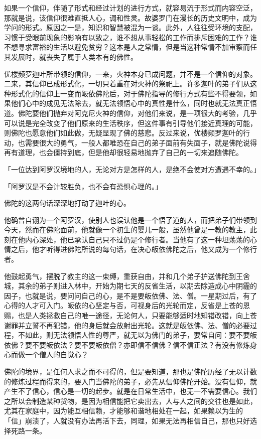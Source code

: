 \documentclass[12pt,twoside,openany]{book}
\begin{document}
如果一个信仰，伴随了形式和经过计划的进行方式，就容易流于形式而内容空泛，那就是说，该信仰很难直抵人心，调和性灵。故婆罗门在漫长的历史文明中，成为学问的形式。原因之一是，知识和智慧被混为一谈。此外，人往往受环境的支配，习惯于受眼前现象的影响有以致之，谁不想从事轻松的工作而排斥困难的工作？谁不想寻求富裕的生活以避免贫穷？这本是人之常情，但是当这种常情不加审察而任其发展时，就丧失了属于人类本有的佛性。

优楼频罗迦叶所带领的信仰，一来，火神本身已成问题，并不是一个信仰的对象。二来，其信仰已成形式化，一切只着重在对火神的祭祀上。许多迦叶的弟子们从这种形式化的信仰上一变而皈依佛陀后，对于佛陀指导的修行方式有些不得要领，如果他们心中的成见无法除去，就无法领悟心中的真性是什么，同时也就无法真正悟道。佛陀要他们抛弃对阿克尼火神的信仰，对他们来说，是一项很大的考验，几乎可以说是完全改变了他们原来的生活秩序，但这件事有引导他们接近真理的可能，则佛陀也愿意他们如此做，无疑显现了佛的慈悲。反过来说，优楼频罗迦叶的行动，也需要很大的勇气，一般人都唯恐在自己的弟子面前有失面子，就是佛陀说得再有道理，也会僵持到底，但是他却很轻易地抛弃了自己的一切来追随佛陀。

「一位达到阿罗汉境地的人，无论对方是怎样的人，是绝不会使对方遭遇不幸的。」

「阿罗汉是不会计较胜负，也不会有恐惧心理的。」

佛陀的这两句话深深地打动了迦叶的心。

他确曾自诩为一个阿罗汉，使别人也误认他是一个悟了道的人，而把弟子们带领到今天，然而在佛陀面前，他就像一个初生的婴儿一般，虽然他曾是一教的教主，此刻在他内心深处，他已承认自己只不过仍是个修行者。当他有了这一种坦荡荡的心情之后，他才听得进佛陀所说的每句话，在决心皈依佛陀之后，他又成为一个修行者。

他鼓起勇气，摆脱了教主的这一束缚，重获自由，并和几个弟子护送佛陀到王舍城，其余的弟子则进入林中，开始为期七天的反省生活，以期去除造成心中阴霾的因子，也就是说，要问问自己的心，是不是要皈依佛、法、僧。一星期过后，有了心得的人才可入门。皈依的心坚定与否，可视身后的光轮而定，反省是上苍的恩赐，也是人类拯救自己的唯一途径，无论何人，只要能够适时地知错改错，向上苍谢罪并立誓不再犯错，他的身后就会放射出光轮。这就是皈依佛、法、僧的必要过程，不如此，则无法领悟人性的尊严，就无以为佛门的弟子，要常自问：要不要皈依佛？要不要皈依法？要不要皈依僧？亦即信不信佛？信不信正法？有没有修炼身心而做一个僧人的自觉心？

佛陀的境界，是任何人求之而不可得的，但是要知道，那也是佛陀历经了无以计数的修炼过程而得来的，要入门当佛陀的弟子，必先从信仰佛陀开始。没有信仰，就产生不了信心，信心是一切的起步。就是在日常生活中，也无一不需要信心。我们之所以会制造某种货物，是因为相信能把它卖出去，人与人之间的交往也是如此，尤其在家庭中，因为能互相信赖，才能够和谐地相处在一起，如果赖以为生的「信」崩溃了，人就没有办法再活下去，同理，如果无法再相信自己，那也只好选择死路一条。
\end{document}
